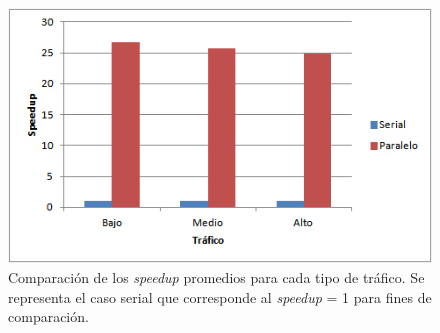 \begin{figure}[ht]
	\centering
	\includegraphics[width=0.8\linewidth]{Figures/speedup1}
	\caption[Comparación de los \emph{speedup} promedios para cada tipo de tráfico.]{Comparación de los \emph{speedup} promedios para cada tipo de tráfico. Se representa el caso serial que corresponde al \emph{speedup} = 1 para fines de comparación.}
	\label{fig:speedup1}
\end{figure}
